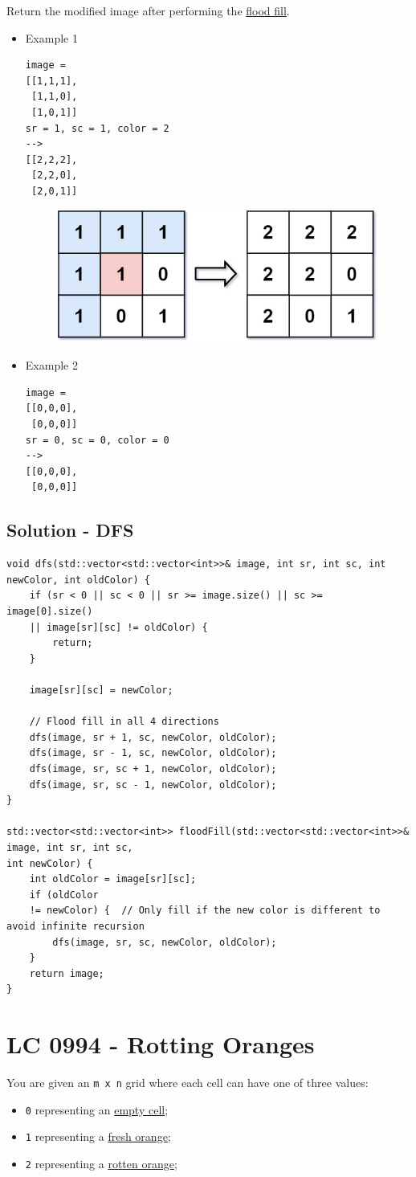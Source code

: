 Return the modified image after performing the \ul{flood fill}.\\

\begin{itemize}
\item Example 1
\begin{lstlisting}
image = 
[[1,1,1],
 [1,1,0],
 [1,0,1]]
sr = 1, sc = 1, color = 2
--> 
[[2,2,2],
 [2,2,0],
 [2,0,1]]
\end{lstlisting}
\begin{figure}[H]
\centering
\includegraphics[width=0.4\linewidth]{images/lc0733_eg}
\label{fig:lc0733eg}
\end{figure}
\item Example 2
\begin{lstlisting}
image = 
[[0,0,0],
 [0,0,0]]
sr = 0, sc = 0, color = 0
-->
[[0,0,0],
 [0,0,0]]
\end{lstlisting}
\end{itemize}

\subsection*{Solution - DFS}
\begin{lstlisting}
void dfs(std::vector<std::vector<int>>& image, int sr, int sc, int newColor, int oldColor) {
	if (sr < 0 || sc < 0 || sr >= image.size() || sc >= image[0].size()
	|| image[sr][sc] != oldColor) {
		return;
	}
	
	image[sr][sc] = newColor;
	
	// Flood fill in all 4 directions
	dfs(image, sr + 1, sc, newColor, oldColor);
	dfs(image, sr - 1, sc, newColor, oldColor);
	dfs(image, sr, sc + 1, newColor, oldColor);
	dfs(image, sr, sc - 1, newColor, oldColor);
}

std::vector<std::vector<int>> floodFill(std::vector<std::vector<int>>& image, int sr, int sc,
int newColor) {
	int oldColor = image[sr][sc];
	if (oldColor
	!= newColor) {  // Only fill if the new color is different to avoid infinite recursion
		dfs(image, sr, sc, newColor, oldColor);
	}
	return image;
}
\end{lstlisting}

\section{LC 0994 - Rotting Oranges}
You are given an {\colorbox{CodeBackground}{\lstinline|m x n|}} grid where each cell can have one of three values:
\begin{itemize}
\item {\colorbox{CodeBackground}{\lstinline|0|}} representing an \ul{empty cell};
\item {\colorbox{CodeBackground}{\lstinline|1|}} representing a \ul{fresh orange};
\item {\colorbox{CodeBackground}{\lstinline|2|}} representing a \ul{rotten orange};
\end{itemize}

